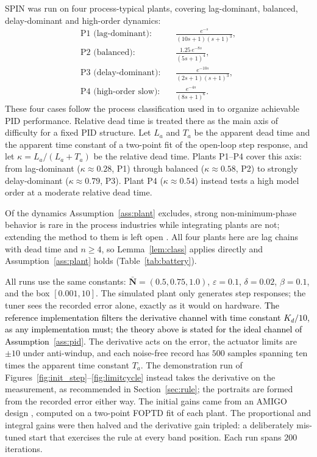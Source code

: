 \documentclass[final,3p,times,twocolumn]{elsarticle}
\newcommand{\spin}{SPIN\xspace}
\newcommand{\fix}[1]{#1}  %
\newcommand{\new}[1]{\textcolor{black}{#1}}  %
\begin{document}
\spin was run on four process-typical plants, covering lag-dominant,
balanced, delay-dominant and high-order dynamics:
\begin{align*}
\text{P1 (lag-dominant):} &\quad \tfrac{e^{-s}}{(10s+1)(s+1)^3}, \\
\text{P2 (balanced):} &\quad \tfrac{1.25\,e^{-8s}}{(5s+1)^4}, \\
\text{P3 (delay-dominant):} &\quad \tfrac{e^{-10s}}{(2s+1)(s+1)^3}, \\
\text{P4 (high-order slow):} &\quad \tfrac{e^{-4s}}{(8s+1)^6}.
\end{align*}
These four cases follow the process classification used in
\cite{AstromHagglund2004} to organize achievable PID performance.
Relative dead time is treated there as the main axis of difficulty for
a fixed PID structure. Let $L_a$ and $T_a$ be the apparent dead time and
the apparent time constant of a two-point fit of the open-loop step
response, and let $\kappa = L_a/(L_a{+}T_a)$ be the relative dead time.
Plants P1--P4 cover this axis: from lag-dominant ($\kappa \approx 0.28$,
P1) through balanced ($\kappa \approx 0.58$, P2) to strongly
delay-dominant ($\kappa \approx 0.79$, P3). Plant P4
($\kappa \approx 0.54$) instead tests a high model order at a moderate
relative dead time.

Of the dynamics Assumption~\ref{ass:plant} excludes, strong
non-minimum-phase behavior is rare in the process industries while
integrating plants are not; extending the method to them is left open
\cite{Desborough2002}. \fix{All four plants here are lag chains
with dead time and $n\ge 4$, so Lemma~\ref{lem:class} applies directly
and Assumption~\ref{ass:plant} holds} (Table~\ref{tab:battery}).

All runs use the same constants: $\bar{\mathbf N} = (0.5, 0.75, 1.0)$,
$\varepsilon = 0.1$, $\delta = 0.02$, $\beta = 0.1$, and the box
$[0.001, 10]$. The simulated plant only generates step responses; the
tuner sees the recorded error alone, exactly as it would on hardware.
\new{The reference implementation filters the derivative channel with
time constant $K_d/10$, as any implementation must; the theory above is
stated for the ideal channel of Assumption~\ref{ass:pid}.}
The derivative acts on the error, the actuator limits are $\pm 10$
under anti-windup, and each noise-free record has $500$ samples spanning
ten times the apparent time constant $T_a$. The demonstration run
of Figures~\ref{fig:init_step}--\ref{fig:limitcycle} instead takes the
derivative on the measurement, as recommended in
Section~\ref{sec:rule}; the portraits are formed from the recorded
error either way. The initial gains came from an AMIGO design
\cite{AstromHagglund2004}, computed on a two-point FOPTD fit of each
plant. The proportional and integral gains were then halved and the
derivative gain tripled: a deliberately mis-tuned start that exercises
the rule at every band position. Each run spans $200$ iterations.
\end{document}
